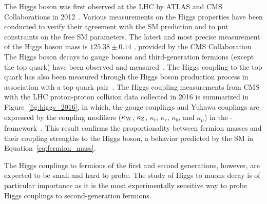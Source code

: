 The Higgs boson was first observed at the LHC by ATLAS and CMS Collaborations in 2012~\cite{Aad:2012tfa, Chatrchyan:2012xdj, Chatrchyan:2013lba}.
Various measurements on the Higgs properties have been conducted to verify their agreement with the SM prediction and to put constraints on the free SM parameters.
The latest and most precise measurement of the Higgs boson mass is $125.38 \pm 0.14$ \GeV, provided by the CMS Collaboration~\cite{2020135425}. 
The Higgs boson decays to gauge bosons and third-generation fermions (except the top quark) have been observed 
and measured~\cite{Sirunyan:2312121, 201996, Sirunyan:2017exp, PhysRevLett.121.121801, 2018283, PhysRevD.99.072001, 201859, 2019508, Aaboud_2018}.
The Higgs coupling to the top quark has also been measured through the Higgs boson production process in association with a top quark pair~\cite{PhysRevLett.120.231801, 2018173}.
The Higgs coupling measurements from CMS with the LHC proton-proton collision data collected in 2016 is summarized in Figure~\ref{fig:higgs_2016},
in which, the gauge couplings and Yukawa couplings are expressed by the coupling modifiers 
($\kappa_{\mathrm{W}}$, $\kappa_{\mathrm{Z}}$, $\kappa_{t}$, $\kappa_{\tau}$, $\kappa_{b}$, and $\kappa_{\mu}$) in the \kappa-framework~\cite{Heinemeyer:2013tqa}.
This result confirms the proportionality between fermion masses and their coupling strengths to the Higgs boson,
a behavior predicted by the SM in Equation~\ref{eq:fermion_mass}.

The Higgs couplings to fermions of the first and second generations, 
however, are expected to be small and hard to probe.
The study of Higgs to muons decay is of particular importance 
as it is the most experimentally sensitive way to probe Higgs couplings to second-generation fermions.
 




